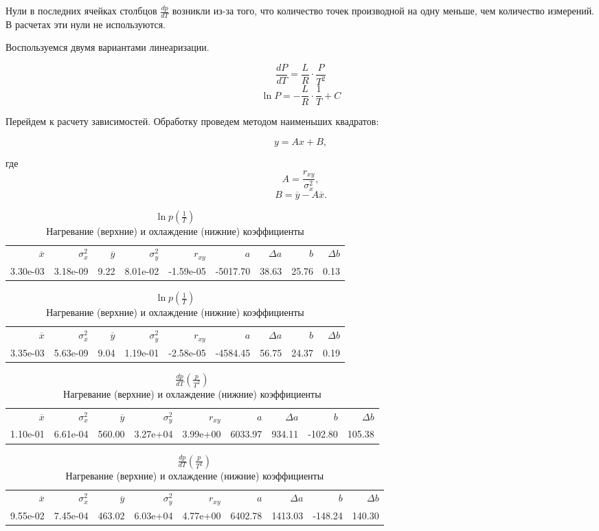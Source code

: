 \documentclass[12pt,a4paper]{article}
\begin{document}
	Нули в последних ячейках столбцов $\frac{dp}{dT}$ возникли из-за того, что количество точек производной на одну меньше, чем количество измерений. В расчетах эти нули не используются.

	Воспользуемся двумя вариантами линеаризации.
	
	$$\frac{dP}{dT} = \frac{L}{R} \cdot \frac{P}{T^2}$$
	$$\ln{P} = -\frac{L}{R} \cdot \frac{1}{T} + C$$
	
	Перейдем к расчету зависимостей. Обработку проведем методом наименьших квадратов:
	
	$$y = Ax + B,$$
	
	где $$A = \frac{r_{xy}}{ \sigma_x^2},$$
	$$B = \overline{y} - A\overline{x}.$$
	
	\begin{table}
	\begin{tabular}{rrrrrrrrr}
	\hline
		$\overline{x}$ & $\sigma_x^2$ & $\overline{y}$ & $\sigma_y^2$ & $r_{xy}$ & $a$ & $\Delta a$ & $b$ & $\Delta b$ \\
		3.30e-03 & 3.18e-09 & 9.22 & 8.01e-02 & -1.59e-05 & -5017.70 & 38.63 & 25.76 & 0.13 \\
	\hline
	\end{tabular}
	\begin{tabular}{rrrrrrrrr}
	\hline
		$\overline{x}$ & $\sigma_x^2$ & $\overline{y}$ & $\sigma_y^2$ & $r_{xy}$ & $a$ & $\Delta a$ & $b$ & $\Delta b$ \\
		3.35e-03 & 5.63e-09 & 9.04 & 1.19e-01 & -2.58e-05 & -4584.45 & 56.75 & 24.37 & 0.19 \\
	\end{tabular}
	\caption{$\ln p (\frac{1}{T})$ \\ Нагревание (верхние) и охлаждение (нижние) коэффициенты}
	\end{table}

	\begin{table}
	\begin{tabular}{rrrrrrrrr}
	\hline
		$\overline{x}$ & $\sigma_x^2$ & $\overline{y}$ & $\sigma_y^2$ & $r_{xy}$ & $a$ & $\Delta a$ & $b$ & $\Delta b$ \\
		1.10e-01 & 6.61e-04 & 560.00 & 3.27e+04 & 3.99e+00 & 6033.97 & 934.11 & -102.80 & 105.38 \\
	\end{tabular}
	\begin{tabular}{rrrrrrrrr}
	\hline
		$\overline{x}$ & $\sigma_x^2$ & $\overline{y}$ & $\sigma_y^2$ & $r_{xy}$ & $a$ & $\Delta a$ & $b$ & $\Delta b$ \\
		9.55e-02 & 7.45e-04 & 463.02 & 6.03e+04 & 4.77e+00 & 6402.78 & 1413.03 & -148.24 & 140.30 \\
	\hline
	\end{tabular}
	\caption{$\frac{dp}{dT} (\frac{p}{T^2})$ \\ Нагревание (верхние) и охлаждение (нижние) коэффициенты}
	\end{table}
\end{document}
